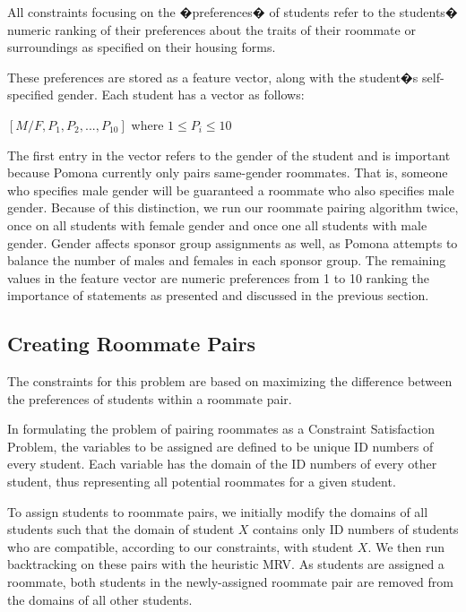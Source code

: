 \documentclass[letterpaper]{article}
\begin{document}
All constraints focusing on the �preferences� of students refer to the students� numeric ranking of their preferences about the traits of their roommate or surroundings as specified on their housing forms.

These preferences are stored as a feature vector, along with the student�s self-specified gender. Each student has a vector as follows:

\begin{center}
	$[M/F, P_1, P_2, ..., P_{10}]$ where $1 \leq P_i \leq 10$
\end{center}

The first entry in the vector refers to the gender of the student and is important because Pomona currently only pairs same-gender roommates. That is, someone who specifies male gender will be guaranteed a roommate who also specifies male gender. Because of this distinction, we run our roommate pairing algorithm twice, once on all students with female gender and once one all students with male gender. Gender affects sponsor group assignments as well, as Pomona attempts to balance the number of males and females in each sponsor group. The remaining values in the feature vector are numeric preferences from 1 to 10 ranking the importance of statements as presented and discussed in the previous section.

\subsection{Creating Roommate Pairs}

The constraints for this problem are based on maximizing the difference between the preferences of students within a roommate pair.

In formulating the problem of pairing roommates as a Constraint Satisfaction Problem, the variables to be assigned are defined to be unique ID numbers of every student. Each variable has the domain of the ID numbers of every other student, thus representing all potential roommates for a given student.

To assign students to roommate pairs, we initially modify the domains of all students such that the domain of student $X$ contains only ID numbers of students who are compatible, according to our constraints, with student $X$. We then run backtracking on these pairs with the heuristic MRV. As students are assigned a roommate, both students in the newly-assigned roommate pair are removed from the domains of all other students.
\end{document}
